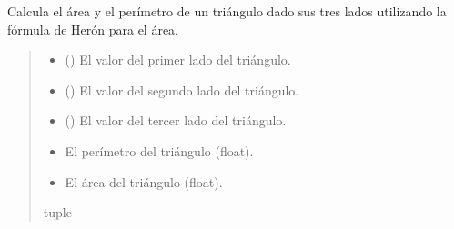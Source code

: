 \documentclass[letterpaper,10pt,spanish]{sphinxmanual}
\begin{document}
\begin{fulllineitems}
\label{\detokenize{pr4:pr4.4.calcular_area_perimetro_triangulo}}
\pysigstartsignatures
{}
\pysigstopsignatures
\sphinxAtStartPar
Calcula el área y el perímetro de un triángulo dado sus tres lados utilizando la fórmula de Herón para el área.
\begin{quote}\begin{description}
\begin{itemize}
\item {} 
\sphinxAtStartPar
{} () \textendash{} El valor del primer lado del triángulo.

\item {} 
\sphinxAtStartPar
{} () \textendash{} El valor del segundo lado del triángulo.

\item {} 
\sphinxAtStartPar
{} () \textendash{} El valor del tercer lado del triángulo.

\end{itemize}

\sphinxAtStartPar
\begin{description}
\begin{itemize}
\item {} 
\sphinxAtStartPar
El perímetro del triángulo (float).

\item {} 
\sphinxAtStartPar
El área del triángulo (float).

\end{itemize}

\end{description}


\sphinxAtStartPar
tuple

\end{description}\end{quote}

\end{fulllineitems}
\end{document}
